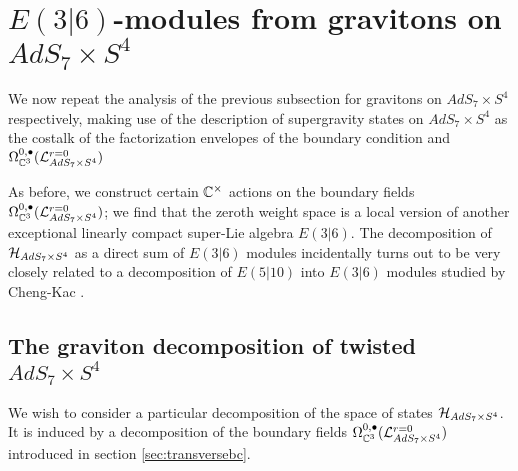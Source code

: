 %
%
%



%
%
%
\section{$E(3|6)$-modules from gravitons on $AdS_7\times S^4$}\label{sec:e36}
We now repeat the analysis of the previous subsection for gravitons on $AdS_7\times S^4$ respectively, making use of the description of supergravity states on $AdS_7\times S^4$ as the costalk of the factorization envelopes of the boundary condition and $\Omega^{0,\bullet}_{\mathbb{C}^3} (\mathcal{L}^{{r=0}}_{AdS_7\times S^4})$

As before, we construct certain $\mathbb{C}^\times$ actions on the boundary fields $\Omega^{0,\bullet}_{\mathbb{C}^3} (\mathcal{L}^{{r=0}}_{AdS_7\times S^4})$; we find that the zeroth weight space is a local version of another exceptional linearly compact super-Lie algebra $E(3|6)$. The decomposition of $\mathcal{H}_{AdS_7\times S^4}$ as a direct sum of $E(3|6)$ modules incidentally turns out to be very closely related to a decomposition of $E(5|10)$ into $E(3|6)$ modules studied by Cheng-Kac \cite{}.

\subsection{The graviton decomposition of twisted $AdS_7\times S^4$}
We wish to consider a particular decomposition of the space of states $\mathcal{H}_{AdS_7\times S^4}$. It is induced by a decomposition of the boundary fields $\Omega^{0,\bullet}_{\mathbb{C}^3} (\mathcal{L}^{{r=0}}_{AdS_7\times S^4} )$ introduced in section \ref{sec:transversebc}. 

